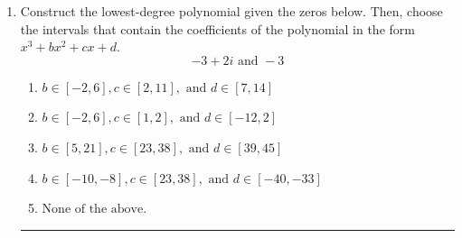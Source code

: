 \documentclass[14pt]{extbook}
\newcommand{\litem}[1]{\item#1\hspace*{-1cm}\rule{\textwidth}{0.4pt}}
\begin{document}
\begin{enumerate}
{\begin{enumerate}[label=\Alph*.]
\end{enumerate} }
\litem{
Construct the lowest-degree polynomial given the zeros below. Then, choose the intervals that contain the coefficients of the polynomial in the form $x^3+bx^2+cx+d$.\[ -3 + 2 i \text{ and } -3 \]\begin{enumerate}[label=\Alph*.]
\item \( b \in [-2, 6], c \in [2, 11], \text{ and } d \in [7, 14] \)
\item \( b \in [-2, 6], c \in [1, 2], \text{ and } d \in [-12, 2] \)
\item \( b \in [5, 21], c \in [23, 38], \text{ and } d \in [39, 45] \)
\item \( b \in [-10, -8], c \in [23, 38], \text{ and } d \in [-40, -33] \)
\item \( \text{None of the above.} \)


\end{enumerate}}
\end{enumerate}
\end{document}
